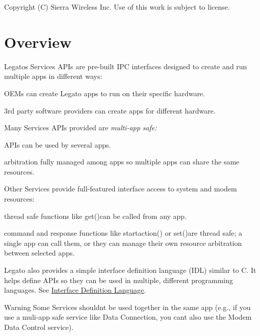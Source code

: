 Copyright (C) Sierra Wireless Inc. Use of this work is subject to license. \hypertarget{legatoServicesOverview}{}\section{Overview}\label{legatoServicesOverview}
Legato\textquotesingle{}s Services A\+P\+Is are pre-\/built I\+P\+C interfaces designed to create and run multiple apps in different ways\+:
\begin{DoxyItemize}
\item O\+E\+M\textquotesingle{}s can create Legato apps to run on their specific hardware.
\item 3rd party software providers can create apps for different hardware.
\end{DoxyItemize}



Many Services A\+P\+Is provided are {\itshape multi-\/app} {\itshape safe\+:} 


\begin{DoxyItemize}
\item A\+P\+Is can be used by several apps.
\item arbitration fully managed among apps so multiple apps can share the same resources.
\end{DoxyItemize}

Other Services provide full-\/featured interface access to system and modem resources\+:


\begin{DoxyItemize}
\item thread safe functions like {\ttfamily get()can} be called from any app.
\item command and response functions like {\ttfamily startaction()} or {\ttfamily set()are} thread safe; a single app can call them, or they can manage their own resource arbitration between selected apps.
\end{DoxyItemize}

Legato also provides a simple interface definition language (I\+D\+L) similar to C. It helps define A\+P\+Is so they can be used in multiple, different programming languages. See \hyperlink{interfaceDefLang}{Interface Definition Language}.

\begin{DoxyWarning}{Warning}
Some Services shouldn\textquotesingle{}t be used together in the same app (e.\+g., if you use a muli-\/app safe service like Data Connection, you can\textquotesingle{}t also use the Modem Data Control service).
\end{DoxyWarning}




